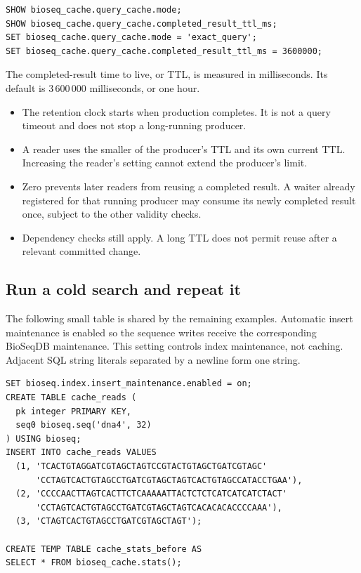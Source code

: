 \par\noindent\begin{minipage}{\linewidth}
\begin{lstlisting}[style=bioseq-appendix-sql,
  caption={Inspect the defaults and enable exact-result caching.}]
SHOW bioseq_cache.query_cache.mode;
SHOW bioseq_cache.query_cache.completed_result_ttl_ms;
SET bioseq_cache.query_cache.mode = 'exact_query';
SET bioseq_cache.query_cache.completed_result_ttl_ms = 3600000;
\end{lstlisting}
\end{minipage}

The completed-result time to live, or TTL, is measured in milliseconds.
Its default is 3\,600\,000 milliseconds, or one hour.
\begin{itemize}
  \item The retention clock starts when production completes. It is not
    a query timeout and does not stop a long-running producer.
  \item A reader uses the smaller of the producer's TTL and its own current
    TTL. Increasing the reader's setting cannot extend the producer's limit.
  \item Zero prevents later readers from reusing a completed result. A
    waiter already registered for that running producer may consume its
    newly completed result once, subject to the other validity checks.
  \item Dependency checks still apply. A long TTL does not permit reuse
    after a relevant committed change.
\end{itemize}

\subsection{Run a cold search and repeat it}

The following small table is shared by the remaining examples. Automatic
insert maintenance is enabled so the sequence writes receive the corresponding
BioSeqDB maintenance. This setting controls index maintenance, not caching.
Adjacent SQL string literals separated by a newline form one string.

\par\noindent\begin{minipage}{\linewidth}
\begin{lstlisting}[style=bioseq-appendix-sql,
  caption={Prepare a small sequence table for cache inspection.}]
SET bioseq.index.insert_maintenance.enabled = on;
CREATE TABLE cache_reads (
  pk integer PRIMARY KEY,
  seq0 bioseq.seq('dna4', 32)
) USING bioseq;
INSERT INTO cache_reads VALUES
  (1, 'TCACTGTAGGATCGTAGCTAGTCCGTACTGTAGCTGATCGTAGC'
      'CCTAGTCACTGTAGCCTGATCGTAGCTAGTCACTGTAGCCATACCTGAA'),
  (2, 'CCCCAACTTAGTCACTTCTCAAAAATTACTCTCTCATCATCATCTACT'
      'CCTAGTCACTGTAGCCTGATCGTAGCTAGTCACACACACCCCAAA'),
  (3, 'CTAGTCACTGTAGCCTGATCGTAGCTAGT');

CREATE TEMP TABLE cache_stats_before AS
SELECT * FROM bioseq_cache.stats();
\end{lstlisting}
\end{minipage}

